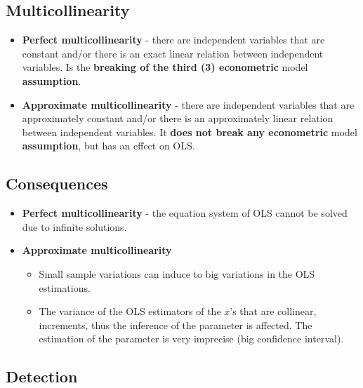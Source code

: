 \documentclass[10pt, a4paper, landscape]{article}
\begin{document}
\begin{multicols}{3}
\columnbreak

\section*{Multicollinearity}

\begin{itemize}[leftmargin=*]
	\item \textbf{Perfect multicollinearity} - there are independent variables that are constant and/or there is an exact linear relation between independent variables. Is the \textbf{breaking of the third (3) econometric} model \textbf{assumption}.
	\item \textbf{Approximate multicollinearity} - there are independent variables that are approximately constant and/or there is an approximately linear relation between independent variables. It \textbf{does not break any econometric} model \textbf{assumption}, but has an effect on OLS.
\end{itemize}

\subsection*{Consequences}

\begin{itemize}[leftmargin=*]
	\item \textbf{Perfect multicollinearity} - the equation system of OLS cannot be solved due to infinite solutions.
	\item \textbf{Approximate multicollinearity}
	\begin{itemize}[leftmargin=*]
		\item Small sample variations can induce to big variations in the OLS estimations.
		\item The variance of the OLS estimators of the \( x \)'s that are collinear, increments, thus the inference of the parameter is affected. The estimation of the parameter is very imprecise (big confidence interval).
	\end{itemize}
\end{itemize}

\subsection*{Detection}


\end{multicols}
\end{document}
